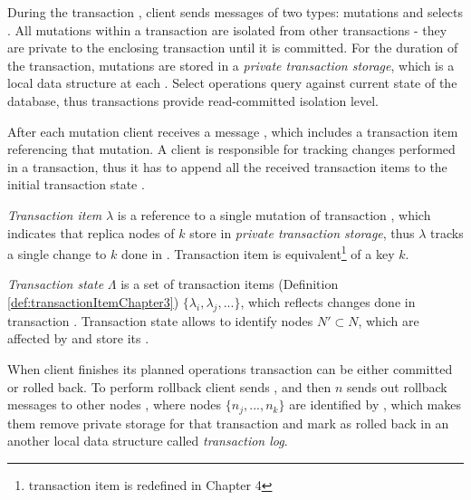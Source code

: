 During the transaction \transaction, client \client sends messages of two types:
 mutations and selects \selectMessage. 
 All mutations within a transaction \transaction are isolated from other transactions - they are private to the enclosing transaction until it is committed.
For the duration of the transaction,
mutations are stored in a \emph{private transaction storage}, which is a local data structure at each . Select operations query against current state of the database, thus transactions provide read-committed isolation level.

After each mutation client \client receives a message \updateTxStateMessage, which includes a transaction item \txItem referencing that mutation. A client is responsible for tracking changes performed in a transaction, thus it has to append all the received transaction items to the initial transaction state .


\begin{definition}
\label{def:transactionItemChapter3}
\emph{Transaction item}  $\lambda$ is a reference to a single mutation  of transaction \transaction, which indicates that replica nodes of $k$ store  in \emph{private transaction storage}, thus $\lambda$ tracks a single change to $k$ done in \transaction. Transaction item is equivalent\footnote{transaction item is redefined in Chapter 4} of a key $k$.
\end{definition}

\begin{definition}
\label{def:transactionStateChapter3}
\emph{Transaction state} $\Lambda$ is a set of transaction items (Definition \ref{def:transactionItemChapter3}) $\{\lambda_{i}, \lambda_{j}, ...\}$, which reflects changes done in transaction \transaction. Transaction state allows to identify nodes $N' \subset N$, which are affected by \transaction and store its \mutations.
\end{definition}



When client \client finishes its planned operations transaction \transaction can be either committed or rolled back. To perform rollback client sends \txRollbackMessage, and then $n$ sends out rollback messages to other nodes \rollbackMessage, where nodes $\{n_j,...,n_k\}$ are identified by \txItems, which 
makes them remove private storage for that transaction
and mark \transaction as rolled back in 
an another local data structure called \emph{transaction log}.

